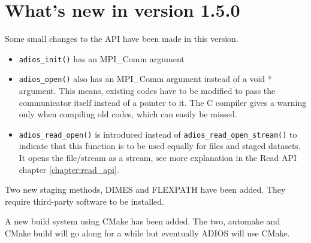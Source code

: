 %
%
%
%
%

\section {What's new in version 1.5.0}

Some small changes to the API have been made in this version. 
\begin{itemize}
\item \verb+adios_init()+ has an MPI\_Comm argument
\item \verb+adios_open()+ also has an MPI\_Comm argument instead of a void * argument. This means, existing codes have to be modified to pass the communicator itself instead of a pointer to it. The C compiler gives a warning only when compiling old codes, which can easily be missed. 
\item \verb+adios_read_open()+ is introduced instead of \verb+adios_read_open_stream()+ to indicate that this function is to be used equally for files and staged datasets. It opens the file/stream as a stream, see more explanation in the Read API chapter \ref{chapter:read_api}.
\end{itemize}

Two new staging methods, DIMES and FLEXPATH have been added. They require third-party software to be installed.

A new build system using CMake has been added. The two, automake and CMake build will go along for a while but eventually ADIOS will use CMake. 

